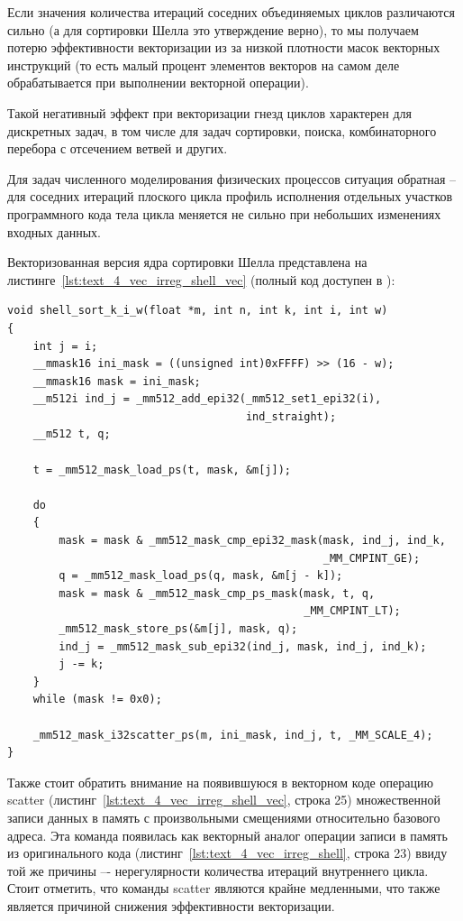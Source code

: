 Если значения количества итераций соседних объединяемых циклов различаются сильно (а для сортировки Шелла это утверждение верно), то мы получаем потерю эффективности векторизации из за низкой плотности масок\label{term:vector_mask_density5} векторных инструкций (то есть малый процент элементов векторов на самом деле обрабатывается при выполнении векторной операции).

Такой негативный эффект при векторизации гнезд циклов характерен для дискретных задач, в том числе для задач сортировки, поиска, комбинаторного перебора с отсечением ветвей и других.

Для задач численного моделирования физических процессов ситуация обратная -- для соседних итераций плоского цикла профиль исполнения\label{term:execution_profile3} отдельных участков программного кода тела цикла меняется не сильно при небольших изменениях входных данных.

Векторизованная версия ядра сортировки Шелла представлена на листинге~\ref{lst:text_4_vec_irreg_shell_vec} (полный код доступен в \cite{iparGithub}):

\begin{lstlisting}[caption={Векторизованный вариант ядра сортировки Шелла.},label={lst:text_4_vec_irreg_shell_vec}]
void shell_sort_k_i_w(float *m, int n, int k, int i, int w)
{
    int j = i;
    __mmask16 ini_mask = ((unsigned int)0xFFFF) >> (16 - w);
    __mmask16 mask = ini_mask;
    __m512i ind_j = _mm512_add_epi32(_mm512_set1_epi32(i),
                                     ind_straight);
    __m512 t, q;

    t = _mm512_mask_load_ps(t, mask, &m[j]);

    do
    {
        mask = mask & _mm512_mask_cmp_epi32_mask(mask, ind_j, ind_k,
                                                 _MM_CMPINT_GE);
        q = _mm512_mask_load_ps(q, mask, &m[j - k]);
        mask = mask & _mm512_mask_cmp_ps_mask(mask, t, q,
                                              _MM_CMPINT_LT);
        _mm512_mask_store_ps(&m[j], mask, q);
        ind_j = _mm512_mask_sub_epi32(ind_j, mask, ind_j, ind_k);
        j -= k;
    }
    while (mask != 0x0);

    _mm512_mask_i32scatter_ps(m, ini_mask, ind_j, t, _MM_SCALE_4);
}
\end{lstlisting}

Также стоит обратить внимание на появившуюся в векторном коде операцию scatter (листинг~\ref{lst:text_4_vec_irreg_shell_vec}, строка 25) множественной записи данных в память с произвольными смещениями относительно базового адреса.
Эта команда появилась как векторный аналог операции записи в память из оригинального кода (листинг~\ref{lst:text_4_vec_irreg_shell}, строка 23) ввиду той же причины –- нерегулярности количества итераций внутреннего цикла.
Стоит отметить, что команды scatter являются крайне медленными, что также является причиной снижения эффективности векторизации.

